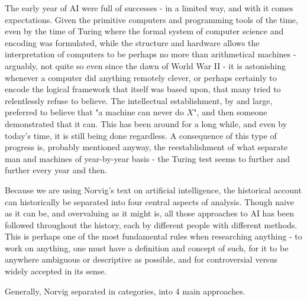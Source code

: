 The early year of AI were full of successes - in a limited way, and with it comes expectations. Given the primitive computers and programming tools of the time, even by the time of Turing where the formal system of computer science and encoding was formulated, while the structure and hardware allows the interpretation of computers to be perhaps no more than arithmetical machines - arguably, not quite so even since the dawn of World War II - it is astonishing whenever a computer did anything remotely clever, or perhaps certainly to encode the logical framework that itself was based upon, that many tried to relentlessly refuse to believe. The intellectual establishment, by and large, preferred to believe that "a machine can never do $X$", and then someone demonstrated that it can. This has been around for a long while, and even by today's time, it is still being done regardless. A consequence of this type of progress is, probably mentioned anyway, the reestablishment of what separate man and machines of year-by-year basis - the Turing test seems to further and further every year and then. 

Because we are using Norvig's text on artificial intelligence, the historical account can historically be separated into four central aspects of analysis. Though naive as it can be, and overvaluing as it might is, all those approaches to AI has been followed throughout the history, each by different people with different methods. This is perhaps one of the most fundamental rules when researching anything - to work on anything, one must have a definition and concept of such, for it to be anywhere ambiguous or descriptive as possible, and for controversial versus widely accepted in its sense. 

    Generally, Norvig \cite{10.5555/1671238} separated in categories, into 4 main approaches. 

